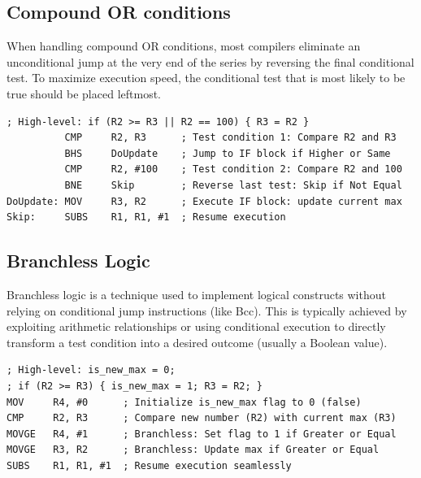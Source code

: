 \documentclass[../comorg-part1.tex]{subfiles}
\begin{document}
\noindent
\begin{minipage}{\textwidth}
\subsection{Compound OR conditions}
When handling compound OR conditions, most compilers eliminate an unconditional jump at the very end of the series by reversing the final conditional test.
To maximize execution speed, the conditional test that is most likely to be true should be placed leftmost.

\begin{lstlisting}[language=ARM, title={Finding Largest Number: Compound OR}, keepspaces=true]
; High-level: if (R2 >= R3 || R2 == 100) { R3 = R2 }
          CMP     R2, R3      ; Test condition 1: Compare R2 and R3
          BHS     DoUpdate    ; Jump to IF block if Higher or Same
          CMP     R2, #100    ; Test condition 2: Compare R2 and 100
          BNE     Skip        ; Reverse last test: Skip if Not Equal
DoUpdate: MOV     R3, R2      ; Execute IF block: update current max
Skip:     SUBS    R1, R1, #1  ; Resume execution
\end{lstlisting}
\end{minipage}

\noindent
\begin{minipage}{\textwidth}
\subsection{Branchless Logic}
Branchless logic is a technique used to implement logical constructs without relying on conditional jump instructions (like Bcc).
This is typically achieved by exploiting arithmetic relationships or using conditional execution to directly transform a test condition into a desired outcome (usually a Boolean value).


\begin{lstlisting}[language=ARM, title={Finding Largest Number: Branchless Logic}, keepspaces=true]
; High-level: is_new_max = 0;
; if (R2 >= R3) { is_new_max = 1; R3 = R2; }
MOV     R4, #0      ; Initialize is_new_max flag to 0 (false)
CMP     R2, R3      ; Compare new number (R2) with current max (R3)
MOVGE   R4, #1      ; Branchless: Set flag to 1 if Greater or Equal
MOVGE   R3, R2      ; Branchless: Update max if Greater or Equal
SUBS    R1, R1, #1  ; Resume execution seamlessly
\end{lstlisting}
\end{minipage}
\end{document}
